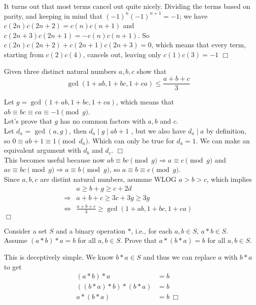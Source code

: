 \begin{solution}[-1]
    It turns out that most terms cancel out quite nicely. Dividing the terms based on parity, and keeping in mind that $(-1)^n(-1)^{n+1} = -1$; we have $c(2n)c(2n+2) = c(n)c(n+1)$ and $c(2n+3)c(2n+1) = -c(n)c(n+1)$. So $c(2n)c(2n+2) + c(2n+1)c(2n+3) = 0$, which means that every term, starting from $c(2)c(4)$, cancels out, leaving only $c(1)c(3) = -1$ $\Box$
\end{solution}

\begin{problem}[B][6][St. Petersburg 2008]
    Given three distinct natural numbers $a,b,c$ show that
    $$ \gcd (1+ab,1+bc,1+ca) \leq \frac{a+b+c}{3} $$ 
\end{problem}

\begin{solution}
    Let $g = \gcd (1+ab,1+bc,1+ca)$, which means that 
    $ab \equiv bc \equiv ca \equiv -1 \pmod g$. \\[3mm]
    Let's prove that $g$ has no common factors with $a,b$ and $c$. \\
    Let $d_a$ = $\gcd(a,g)$, then $d_a \mid g \mid ab+1$ , but we also have $d_a \mid a$ by definition, so  $0  \equiv ab +1 \equiv1 \pmod {d_a}$. Which can only be true for $d_a=1$. We can make an equivalent argument with $d_b$ and $d_c$. $\Box$ \\[2mm]
    This becomes useful because now $ab \equiv bc \pmod g \Rightarrow a \equiv c \pmod g$ and $ac \equiv bc \pmod g \Rightarrow a \equiv b \pmod g$, so $a \equiv b \equiv c \pmod g$. \\[2mm]
    Since $a,b,c$ are distint natural numbers, asumme WLOG $a>b>c$, which implies 
    \begin{align*}
        &a \geq b + g \geq c + 2d \\
        \Rightarrow &a + b + c \geq 3c + 3g \geq 3g \\
        \iff &\frac{a+b+c}{3} \geq \gcd (1+ab,1+bc,1+ca)
    \end{align*}
    $\Box$
\end{solution}

\begin{problem}[B][6][Putnam 2001]
    Consider a set $S$ and a binary operation $*$, i.e., for each $a,b \in S$, $a*b \in S$. Assume $(a*b)*a = b$ for all $a,b \in S$. Prove that $a * (b * a) = b$ for all $a,b \in S$.
\end{problem}

\begin{solution}
    This is deceptively simple. We know $b*a\in S$ and thus we can replace $a$ with $b*a$ to get
    \begin{align*}
            (a*b)*a &= b\\
            ((b*a)*b)*(b*a) &= b\\
            a*(b*a) &= b \ \Box
    \end{align*}
\end{solution}

